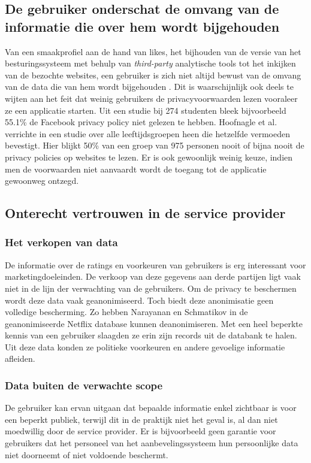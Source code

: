 \subsection{De gebruiker onderschat de omvang van de informatie die over hem wordt bijgehouden}
Van een smaakprofiel aan de hand van likes, het bijhouden van de versie van het besturingssysteem met behulp van \emph{third-party} analytische tools tot het inkijken van de bezochte websites, een gebruiker is zich niet altijd bewust van de omvang van de data die van hem wordt bijgehouden \cite{pirs}. Dit is waarschijnlijk ook deels te wijten aan het feit dat weinig gebruikers de privacyvoorwaarden lezen vooraleer ze een applicatie starten. Uit een studie \cite{privdisc} bij 274 studenten bleek bijvoorbeeld 55.1\% de Facebook privacy policy niet gelezen te hebben. Hoofnagle et al. verrichte in \cite{hoofnagle} een studie over alle leeftijdsgroepen heen die hetzelfde vermoeden bevestigt. Hier blijkt  50\% van een groep van 975 personen nooit of bijna nooit de privacy policies op websites te lezen. Er is ook gewoonlijk weinig keuze, indien men de voorwaarden niet aanvaardt wordt de toegang tot de applicatie gewoonweg ontzegd. 
\subsection{Onterecht vertrouwen in de service provider}
\label{onterecht_vertrouwen}
\subsubsection{Het verkopen van data}
De informatie over de ratings en voorkeuren van gebruikers is erg interessant voor marketingdoeleinden. De verkoop van deze gegevens aan derde partijen ligt vaak niet in de lijn der verwachting van de gebruikers. Om de privacy te beschermen wordt deze data vaak geanonimiseerd. Toch biedt deze anonimisatie geen volledige bescherming. Zo hebben Narayanan en Schmatikov in \cite{Narayanan2008} de geanonimiseerde Netflix database kunnen deanonimiseren. Met een heel beperkte kennis van een gebruiker slaagden ze erin zijn records uit de databank te halen. Uit deze data konden ze politieke voorkeuren en andere gevoelige informatie afleiden.
\subsubsection{Data buiten de verwachte scope \cite{pirs}}
De gebruiker kan ervan uitgaan dat bepaalde informatie enkel zichtbaar is voor een beperkt publiek, terwijl dit in de praktijk niet het geval is, al dan niet moedwillig door de service provider. Er is bijvoorbeeld geen garantie voor gebruikers dat het personeel van het aanbevelingssysteem hun persoonlijke data niet doorneemt of niet voldoende beschermt.\\

